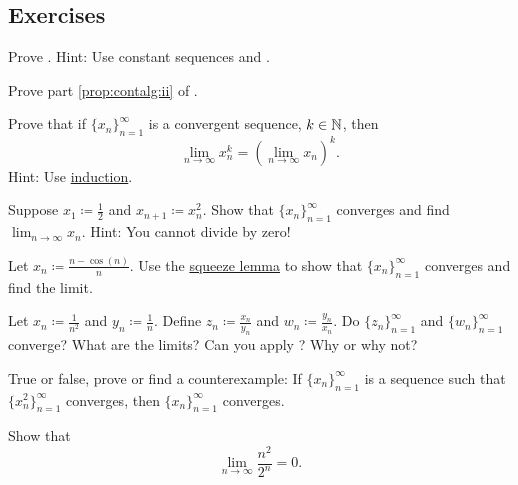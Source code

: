 \subsection{Exercises}

\begin{exercise}
Prove .  Hint: Use constant sequences
and .
\end{exercise}

\begin{exercise}
Prove part \ref{prop:contalg:ii} of .
\end{exercise}

\begin{exercise}
Prove that if $\{ x_n \}_{n=1}^\infty$ is a convergent sequence, $k \in {\mathbb{N}}$, then
\begin{equation*}
\lim_{n\to\infty} x_n^k = 
{\left( \lim_{n\to\infty} x_n \right)}^k .
\end{equation*}
Hint: Use \hyperref[induction:thm]{induction}.
\end{exercise}

\begin{exercise}
Suppose $x_1 \coloneqq \frac{1}{2}$ and $x_{n+1} \coloneqq x_n^2$.  Show that
$\{ x_n \}_{n=1}^\infty$ converges and find
$\lim_{n\to\infty} x_n$.  Hint: You cannot divide by zero!
\end{exercise}

\begin{exercise}
Let $x_n \coloneqq \frac{n-\cos(n)}{n}$.  Use the
\hyperref[squeeze:lemma]{squeeze lemma} to show that
$\{ x_n \}_{n=1}^\infty$ converges and find the limit.
\end{exercise}

\begin{exercise}
Let $x_n \coloneqq \frac{1}{n^2}$ and $y_n \coloneqq \frac{1}{n}$.  Define
$z_n \coloneqq \frac{x_n}{y_n}$ and 
$w_n \coloneqq \frac{y_n}{x_n}$.  Do $\{ z_n \}_{n=1}^\infty$ and $\{ w_n \}_{n=1}^\infty$
converge?  What are the limits?  Can you apply ?
Why or why not?
\end{exercise}

\begin{exercise}
True or false, prove or find a counterexample:
If $\{ x_n \}_{n=1}^\infty$ is a sequence
such that $\{ x_n^2 \}_{n=1}^\infty$ converges, then $\{ x_n \}_{n=1}^\infty$ converges.
\end{exercise}

\begin{exercise}
Show that
\begin{equation*}
\lim_{n\to\infty} \frac{n^2}{2^n} = 0 .
\end{equation*}
\end{exercise}


